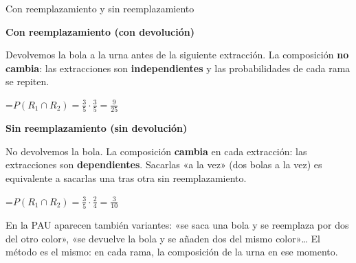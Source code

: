 \documentclass[11pt,a4paper]{article}
\newcommand{\fmm}[1]{\setbox0=\hbox{$#1$}\ifdim\wd0>\linewidth\[#1\]\else\mbox{\box0}\fi}
\begin{document}
  
\begin{fmdef}{Con reemplazamiento y sin reemplazamiento}
\par\noindent \begin{minipage}[t]{0.488\linewidth}\vspace{0pt}\begin{tcolorbox}[enhanced,colback=fmsurface,colframe=fmmuted!35,arc=2.5mm,boxrule=0.6pt,left=2.5mm,right=2.5mm,top=1.5mm,bottom=1.5mm,before upper=\raggedright,equal height group=cmp2]{\color{fmnavy}\bfseries Con reemplazamiento (con devolución)}\par

          

Devolvemos la bola a la urna antes de la siguiente extracción. La composición \textbf{no cambia}: las extracciones son \textbf{independientes} y las probabilidades de cada rama se repiten.

          

\fmm{P(R_1\cap R_2)=\frac35\cdot\frac35=\frac{9}{25}}\end{tcolorbox}\end{minipage}\hfill\begin{minipage}[t]{0.488\linewidth}\vspace{0pt}\begin{tcolorbox}[enhanced,colback=fmsurface,colframe=fmmuted!35,arc=2.5mm,boxrule=0.6pt,left=2.5mm,right=2.5mm,top=1.5mm,bottom=1.5mm,before upper=\raggedright,equal height group=cmp2]{\color{fmnavy}\bfseries Sin reemplazamiento (sin devolución)}\par

          

No devolvemos la bola. La composición \textbf{cambia} en cada extracción: las extracciones son \textbf{dependientes}. Sacarlas «a la vez» (dos bolas a la vez) es equivalente a sacarlas una tras otra sin reemplazamiento.

          

\fmm{P(R_1\cap R_2)=\frac35\cdot\frac24=\frac{3}{10}}\end{tcolorbox}\end{minipage}\par\medskip

      
\begin{fmnote}En la PAU aparecen también variantes: «se saca una bola y se reemplaza por dos del otro color», «se devuelve la bola y se añaden dos del mismo color»\dots{} El método es el mismo: en cada rama, la composición de la urna en ese momento.\end{fmnote}
\end{fmdef}
\end{document}
